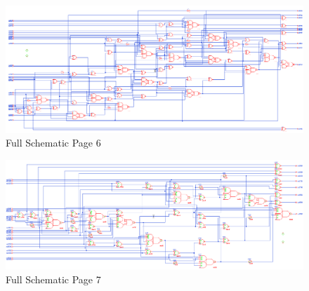 \documentclass[11pt]{article}
\begin{document}
		
		\begin{figure}[H] 
			\centering 
			\includegraphics[width=\textwidth,height=\dimexpr\textheight-4\baselineskip-\abovecaptionskip-\belowcaptionskip\relax,keepaspectratio]{"Pictures/Full Schematic Page 6"}
			\caption{Full Schematic Page 6} 
			\label{fig:Full-Schematic-Page-6} 
		\end{figure}
		
		
		\begin{figure}[H] 
			\centering 
			\includegraphics[width=\textwidth,height=\dimexpr\textheight-4\baselineskip-\abovecaptionskip-\belowcaptionskip\relax,keepaspectratio]{"Pictures/Full Schematic Page 7"}
			\caption{Full Schematic Page 7} 
			\label{fig:Full-Schematic-Page-7} 
		\end{figure}
		
\end{document}
